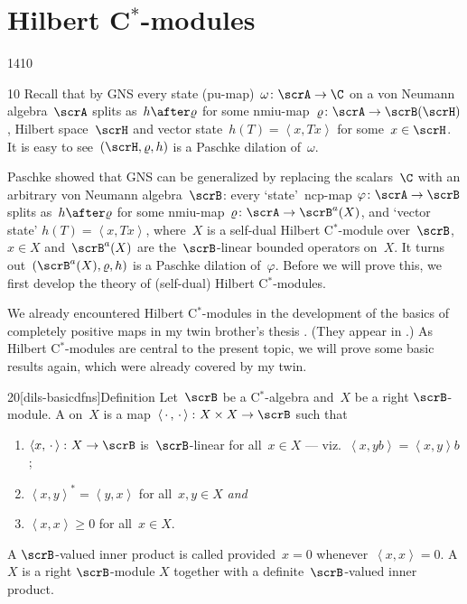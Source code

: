 \section{Hilbert C$^*$-modules}
\begin{parsec}{1410}%
\begin{point}{10}%
Recall that by GNS
    every state (pu-map)~$\omega\colon \scrA \to \C$
    on a von Neumann algebra~$\scrA$
    splits as~$h \after \varrho$
    for some nmiu-map~$\varrho\colon \scrA \to \scrB(\scrH)$,
        Hilbert space~$\scrH$
        and vector state~$h (T) =  \left<x, T x\right>$
         for some~$x \in \scrH$.
It is easy to see~$(\scrH, \varrho, h)$ is a Paschke dilation of~$\omega$.


Paschke showed that GNS can be generalized by replacing the scalars~$\C$
    with an arbitrary von Neumann algebra~$\scrB$:
    every `state'~ncp-map $\varphi\colon \scrA \to \scrB$
    splits as~$h \after \varrho$
    for some nmiu-map~$\varrho\colon \scrA \to \scrB^a (X)$,
    and `vector state' $h(T) = \left<x, Tx\right>$,
    where~$X$ is a self-dual Hilbert C$^*$-module over~$\scrB$, $x \in X$
     and~$\scrB^a(X)$ are the~$\scrB$-linear bounded operators on~$X$.
It turns out~$(\scrB^a(X), \varrho, h)$
    is a Paschke dilation of~$\varphi$.
Before we will prove this,
    we first develop the theory of (self-dual) Hilbert C$^*$-modules.

We already encountered Hilbert C$^*$-modules
    in the development of the basics of completely positive maps
    in my twin brother's thesis \cite{bram}.
(They appear in .)
As Hilbert C$^*$-modules are central to the present topic,
    we will prove some basic results again, which were already
    covered by my twin.
\end{point}
\begin{point}{20}[dils-basicdfns]{Definition}%
    Let~$\scrB$ be a C$^*$-algebra and~$X$
        be a right $\scrB$-module.
        A 
            on~$X$
        is a map~$\left<\,\cdot\,,\,\cdot\,\right>\colon X \times X \to \scrB$
        such that
        \begin{enumerate}
            \item $\left<x, \,\cdot\,\right> \colon X \to  \scrB$
                    is~$\scrB$-linear for all~$x \in X$
                    --- viz.~$\left< x, yb\right> = \left<x, y\right>b$;
            \item $\left<x,y\right>^* = \left<y,x\right>$
                for all~$x,y\in X$ \emph{and}
            \item $\left<x,x\right> \geq 0$ for all~$x \in X$.
        \end{enumerate}
        A $\scrB$-valued inner product is called 
        provided~$x = 0$ whenever~$\left<x,x\right>=0$.
        A  $X$
        is a right $\scrB$-module $X$
        together with a definite~$\scrB$-valued inner product.


\end{point}
\end{parsec}
